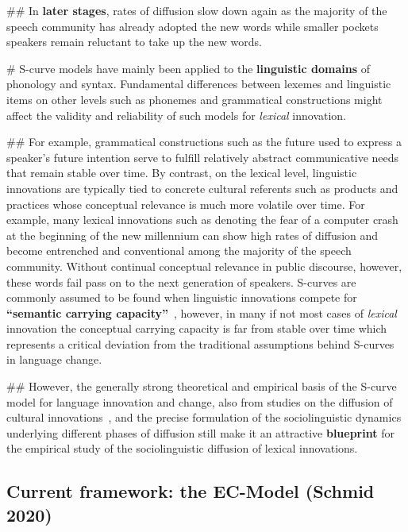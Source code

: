 \documentclass[a4paper]{scrartcl}
\renewcommand{\hw}[1]{\textbf{#1}}
\begin{document}
\begin{easylist}[itemize]
        ## In \hw{later stages}, rates of diffusion slow down again as the majority of the speech community has already adopted the new words while smaller pockets speakers remain reluctant to take up the new words.

      # S-curve models have mainly been applied to the \hw{linguistic domains} of phonology and syntax. Fundamental differences between lexemes and linguistic items on other levels such as phonemes and grammatical constructions might affect the validity and reliability of such models for \emph{lexical} innovation.

        ## For example, grammatical constructions such as the  future used to express a speaker's future intention serve to fulfill relatively abstract communicative needs that remain stable over time. By contrast, on the lexical level, linguistic innovations are typically tied to concrete cultural referents such as products and practices whose conceptual relevance is much more volatile over time. For example, many lexical innovations such as  denoting the fear of a computer crash at the beginning of the new millennium can show high rates of diffusion and become entrenched and conventional among the majority of the speech community. Without continual conceptual relevance in public discourse, however, these words fail pass on to the next generation of speakers. S-curves are commonly assumed to be found when linguistic innovations compete for \hw{\enquote{semantic carrying capacity}}~\parencite{Nini2017}, however, in many if not most cases of \emph{lexical} innovation the conceptual carrying capacity is far from stable over time which represents a critical deviation from the traditional assumptions behind S-curves in language change.

        ## However, the generally strong theoretical and empirical basis of the S-curve model for language innovation and change, also from studies on the diffusion of cultural innovations~\parencite{Rogers1962}, and the precise formulation of the sociolinguistic dynamics underlying different phases of diffusion still make it an attractive \hw{blueprint} for the empirical study of the sociolinguistic diffusion of lexical innovations.

    \end{easylist}

  \subsection{Current framework: the EC-Model (Schmid 2020)}
    \nocite{Schmid2020}
\end{document}
